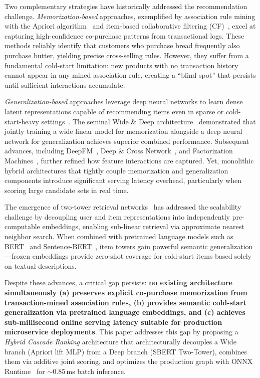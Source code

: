 \documentclass[10pt,conference]{IEEEtran}
\begin{document}
Two complementary strategies have historically addressed the recommendation challenge. \textit{Memorization-based} approaches, exemplified by association rule mining with the Apriori algorithm~\cite{agrawal1994fast} and item-based collaborative filtering (CF)~\cite{sarwar2001item}, excel at capturing high-confidence co-purchase patterns from transactional logs. These methods reliably identify that customers who purchase bread frequently also purchase butter, yielding precise cross-selling rules. However, they suffer from a fundamental cold-start limitation: new products with no transaction history cannot appear in any mined association rule, creating a ``blind spot'' that persists until sufficient interactions accumulate.

\textit{Generalization-based} approaches leverage deep neural networks to learn dense latent representations capable of recommending items even in sparse or cold-start-heavy settings~\cite{he2017neural, cheng2016wide}. The seminal Wide \& Deep architecture~\cite{cheng2016wide} demonstrated that jointly training a wide linear model for memorization alongside a deep neural network for generalization achieves superior combined performance. Subsequent advances, including DeepFM~\cite{guo2017deepfm}, Deep \& Cross Network~\cite{wang2017deep}, and Factorization Machines~\cite{rendle2010factorization}, further refined how feature interactions are captured. Yet, monolithic hybrid architectures that tightly couple memorization and generalization components introduce significant serving latency overhead, particularly when scoring large candidate sets in real time.

The emergence of two-tower retrieval networks~\cite{covington2016deep, yi2019sampling, yang2020mixed} has addressed the scalability challenge by decoupling user and item representations into independently pre-computable embeddings, enabling sub-linear retrieval via approximate nearest neighbor search. When combined with pretrained language models such as BERT~\cite{devlin2019bert} and Sentence-BERT~\cite{reimers2019sentence}, item towers gain powerful semantic generalization---frozen embeddings provide zero-shot coverage for cold-start items based solely on textual descriptions.

Despite these advances, a critical gap persists: \textbf{no existing architecture simultaneously (a) preserves explicit co-purchase memorization from transaction-mined association rules, (b) provides semantic cold-start generalization via pretrained language embeddings, and (c) achieves sub-millisecond online serving latency suitable for production microservice deployments}. This paper addresses this gap by proposing a \textit{Hybrid Cascade Ranking} architecture that architecturally decouples a Wide branch (Apriori lift MLP) from a Deep branch (SBERT Two-Tower), combines them via additive joint scoring, and optimizes the production graph with ONNX Runtime~\cite{vaswani2017attention} for $\sim$0.85\,ms batch inference.
\end{document}
